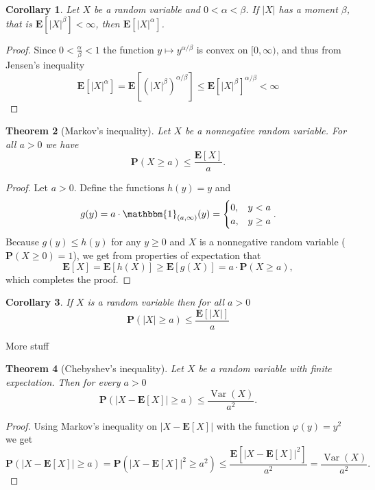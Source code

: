 \documentclass[11pt,a4paper]{article}
\theoremstyle{definition}
\theoremstyle{plain}
\newtheorem{theorem}{Theorem}[section]
\newtheorem{corollary}[theorem]{Corollary}
\DeclareMathOperator{\Var}{Var}
\newcommand{\abs}[1]{\left\lvert #1\right\rvert}
\begin{document}
  \begin{corollary}
    Let $X$ be a random variable and $0 < \alpha < \beta$. 
    If $\abs{X}$ has a moment $\beta$, 
    that is $\mathbf E[\abs{X}^{\beta}] < \infty$,
    then $\mathbf E[\abs{X}^{\alpha}]$.
  \end{corollary}
  \begin{proof}
    Since $0 < \frac{\alpha}{\beta} < 1$ the function 
    $y \mapsto y^{\alpha/\beta}$ is convex on $[0,\infty)$, and thus from
    Jensen's inequality
    \[
      \mathbf{E}[|X|^{\alpha}] =
      \mathbf{E}[(|X|^{\beta})^{\alpha/\beta}] \leq
      \mathbf{E}[|X|^{\beta}]^{\alpha/\beta} <
      \infty
    \]
  \end{proof}

  \begin{theorem}[Markov's inequality]
    Let $X$ be a nonnegative random variable. For all $a > 0$ we have
    \[
      \mathbf{P}(X \geq a) \leq
      \frac{\mathbf{E}[X]}{a}.
    \]
  \end{theorem}
  \begin{proof}
    Let $a > 0$. Define the functions $h(y) = y$ and
    \[
      g(y) =
      a \cdot \mathbbm{1}_{(a,\infty)}(y) =
      \begin{cases}
        0, &y < a \\
        a, &y \geq a
      \end{cases}.
    \]
    Because $g(y) \le h(y)$ for any $y \geq 0$ and $X$ is a nonnegative
    random variable ($\mathbf P(X \geq 0) = 1$), we get from properties
    of expectation that
    \[
      \mathbf{E}[X] =
      \mathbf{E}[h(X)] \geq
      \mathbf{E}[g(X)] =
      a \cdot \mathbf{P}(X \geq a),
    \]
    which completes the proof.
  \end{proof}

  \begin{corollary}
    If $X$ is a random variable then for all $a > 0$
    \[
      \mathbf{P}(|X|\geq a) \leq
      \frac{\mathbf{E}[|X|]}{a}
    \]
  \end{corollary}

  More stuff

  \begin{theorem}[Chebyshev's inequality]
    Let $X$ be a random variable with finite expectation. Then for every
    $a > 0$
    \[
      \mathbf P(\abs{X - \mathbf E[X]} \geq a) \le
      \frac{\Var(X)}{a^2}.
    \]
  \end{theorem}
  \begin{proof}
    Using Markov's inequality on $\abs{X - \mathbf E[X]}$ with the function
    $\varphi(y) = y^2$ we get
    \[
      \mathbf{P}(\abs{X-\mathbf{E}[X]} \geq a) =
      \mathbf{P}(\abs{X-\mathbf{E}[X]}^{2} \geq a^{2}) \leq
      \frac{\mathbf{E}\left[\abs{X-\mathbf{E}[X]}^{2}\right]}{a^{2}} =
      \frac{\Var(X)}{a^2}.
    \]
  \end{proof}
\end{document}
